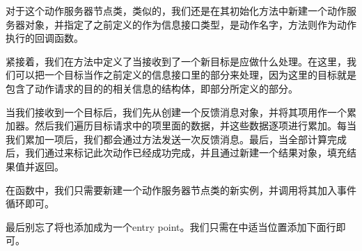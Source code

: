 \documentclass[letterpaper,10pt,english]{sphinxmanual}
\begin{document}
\begin{sphinxVerbatim}[commandchars=\\\{\}]
 

      



   
\end{sphinxVerbatim}

\sphinxAtStartPar
对于这个动作服务器节点类，类似的，我们还是在其初始化方法中新建一个动作服务器对象，并指定了之前定义的作为信息接口类型，是动作名字，方法则作为动作执行的回调函数。

\sphinxAtStartPar
紧接着，我们在方法中定义了当接收到了一个新目标是应做什么处理。在这里，我们可以把一个目标当作之前定义的信息接口里的部分来处理，因为这里的目标就是包含了动作请求的目的的相关信息的结构体，即部分所定义的部分。

\sphinxAtStartPar
当我们接收到一个目标后，我们先从创建一个反馈消息对象，并将其项用作一个累加器。然后我们遍历目标请求中的项里面的数据，并这些数据逐项进行累加。每当我们累加一项后，我们都会通过方法发送一次反馈消息。最后，当全部计算完成后，我们通过来标记此次动作已经成功完成，并且通过新建一个结果对象，填充结果值并返回。

\sphinxAtStartPar
在函数中，我们只需要新建一个动作服务器节点类的新实例，并调用将其加入事件循环即可。

\sphinxAtStartPar
最后别忘了将也添加成为一个entry
point。我们只需在中适当位置添加下面行即可。
\end{document}
